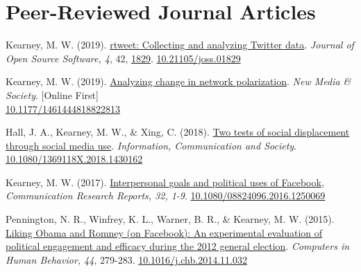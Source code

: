 \section{Peer-Reviewed Journal Articles}
\begin{bibenum}

\item Kearney, M. W. (2019).
  \href{http://mikewk.com/1021105joss01829.pdf}{rtweet: Collecting and analyzing Twitter data}.
	\textit{Journal of Open Source Software, 4}, 42, \href{https://joss.theoj.org/papers/10.21105/joss.01829}{1829}.
	\href{https://doi.org/10.21105/joss.01829}{10.21105/joss.01829}

\item Kearney, M. W. (2019).
	\href{https://doi.org/10.1177/1461444818822813}{Analyzing change in network polarization}.
	\textit{New Media \& Society}. [Online First]\\
	\href{https://doi.org/10.1177/1461444818822813}{10.1177/1461444818822813}

\item Hall, J. A., Kearney, M. W., \& Xing, C. (2018).
	\href{https://www.tandfonline.com/doi/abs/10.1080/1369118X.2018.1430162}{Two tests of social displacement through social media use}.
	\textit{Information, Communication and Society}.
	\href{https://doi.org/10.1080/1369118X.2018.1430162}{10.1080/1369118X.2018.1430162}

\item Kearney, M. W. (2017).
	\href{http://www.tandfonline.com/doi/abs/10.1080/08824096.2016.1250069}{Interpersonal goals and political uses of Facebook},
	\textit{Communication Research Reports, 32, 1-9}.
	\href{https://doi.org/10.1080/08824096.2016.1250069}{10.1080/08824096.2016.1250069}

\item Pennington, N. R., Winfrey, K. L., Warner, B. R., \& Kearney, M. W. (2015).
	\href{https://www.sciencedirect.com/science/article/pii/S0747563214006347}{Liking Obama and Romney (on Facebook): An experimental evaluation of political engagement and efficacy during the 2012 general election}.
	\textit{Computers in Human Behavior, 44}, 279-283.
	\href{https://doi.org/10.1016/j.chb.2014.11.032}{10.1016/j.chb.2014.11.032}


\end{bibenum}
